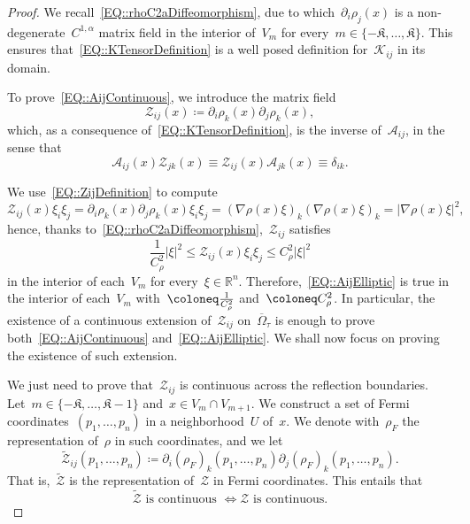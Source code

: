 \documentclass[12pt,a4paper]{amsart}
\makeatletter
\numberwithin{equation}{section}
\theoremstyle{definition}
\theoremstyle{remark}
\newcommand{\R}{\mathbb{R}}
\newcommand{\abs}[1]{\left\lvert#1\right\rvert}
\renewcommand{\leq}{\leqslant}
\newcommand{\const}[1]{%
  \csname const@#1\endcsname%
}
\makeatother
\begin{document}
\begin{proof}
    We recall~\eqref{EQ::rhoC2aDiffeomorphism}, due to which~$\partial_i \rho_j(x)$ is a non-degenerate~$C^{1,\alpha}$ matrix field in the interior of~$V_m$ for every~$m \in \{-\mathfrak{K},\dots,\mathfrak{K}\}$. This ensures that~\eqref{EQ::KTensorDefinition} is a well posed definition for~$\mathcal{K}_{ij}$ in its domain.
    
    To prove~\eqref{EQ::AijContinuous}, we introduce the matrix field
    \begin{equation}\label{EQ::ZijDefinition}
        \mathcal{Z}_{ij}(x) \coloneq \partial_i \rho_k(x)\partial_j \rho_k(x),
    \end{equation}
    which, as a consequence of~\eqref{EQ::KTensorDefinition}, is the inverse of~$\mathcal{A}_{ij}$, in the sense that
    \begin{equation}
        \mathcal{A}_{ij}(x)\mathcal{Z}_{jk}(x) \equiv \mathcal{Z}_{ij}(x)\mathcal{A}_{jk}(x) \equiv \delta_{ik}.
    \end{equation}

    We use~\eqref{EQ::ZijDefinition} to compute
    \begin{equation}
        \mathcal{Z}_{ij}(x) \xi_i \xi_j = \partial_i \rho_k(x)\partial_j \rho_k(x) \xi_i \xi_j = {(\nabla \rho(x) \xi)}_k {(\nabla \rho(x) \xi)}_k = \abs{\nabla \rho(x) \xi}^2,
    \end{equation}
    hence, thanks to~\eqref{EQ::rhoC2aDiffeomorphism},~$\mathcal{Z}_{ij}$ satisfies
    \begin{equation}
            \frac{1}{C_\rho^2}\abs{\xi}^2 \leq \mathcal{Z}_{ij}(x) \xi_i \xi_j\leq C_\rho^2\abs{\xi}^2
    \end{equation}
    in the interior of each~$V_m$ for every~$\xi \in \R^n$. Therefore,~\eqref{EQ::AijElliptic} is true in the interior of each~$V_m$ with~$\const{CONST::AijEllipticLower} \coloneq \frac{1}{C_\rho^2}$ and~$\const{CONST::AijEllipticUpper} \coloneq C_\rho^2$. In particular, the existence of a continuous extension of~$\mathcal{Z}_{ij}$ on~$\overline{\Omega}_\tau$ is enough to prove both~\eqref{EQ::AijContinuous} and~\eqref{EQ::AijElliptic}. We shall now focus on proving the existence of such extension.

    We just need to prove that~$\mathcal{Z}_{ij}$ is continuous across the reflection boundaries. Let~$m \in \{-\mathfrak{K},\dots,\mathfrak{K}-1\}$ and~$x \in V_m \cap V_{m+1}$. We construct a set of Fermi coordinates~$(p_1,\dots,p_n)$ in a neighborhood~$U$ of~$x$. We denote with~$\rho_F$ the representation of~$\rho$ in such coordinates, and we let
    \begin{equation}
        \tilde{\mathcal{Z}}_{ij}(p_1,\dots,p_n) \coloneq \partial_i {(\rho_{F})}_k(p_1,\dots,p_n)\partial_j {(\rho_{F})}_k(p_1,\dots,p_n).
    \end{equation}
    That is,~$\tilde{\mathcal{Z}}$ is the representation of~$\mathcal{Z}$ in Fermi coordinates. This entails that
    \begin{equation}
        \tilde{\mathcal{Z}} \text{ is continuous } \iff \mathcal{Z} \text{ is continuous.}
    \end{equation}


\end{proof}
\end{document}
